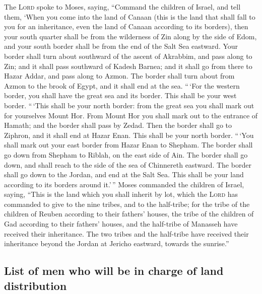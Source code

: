  The \textsc{Lord} spoke to Moses, saying, 
``Command the children of Israel, and tell them, `When you come into the
land of Canaan (this is the land that shall fall to you for an
inheritance, even the land of Canaan according to its borders),
 then your south quarter shall be from the wilderness of
Zin along by the side of Edom, and your south border shall be from the
end of the Salt Sea eastward.  Your border shall turn
about southward of the ascent of Akrabbim, and pass along to Zin; and it
shall pass southward of Kadesh Barnea; and it shall go from there to
Hazar Addar, and pass along to Azmon.  The border shall
turn about from Azmon to the brook of Egypt, and it shall end at the
sea.  ``\,`For the western border, you shall have the
great sea and its border. This shall be your west border. 
``\,`This shall be your north border: from the great sea you shall mark
out for yourselves Mount Hor.  From Mount Hor you shall
mark out to the entrance of Hamath; and the border shall pass by Zedad.
 Then the border shall go to Ziphron, and it shall end at
Hazar Enan. This shall be your north border.  ``\,`You
shall mark out your east border from Hazar Enan to Shepham.
 The border shall go down from Shepham to Riblah, on the
east side of Ain. The border shall go down, and shall reach to the side
of the sea of Chinnereth eastward.  The border shall go
down to the Jordan, and end at the Salt Sea. This shall be your land
according to its borders around it.'\,''  Moses commanded
the children of Israel, saying, ``This is the land which you shall
inherit by lot, which the \textsc{Lord} has commanded to give to the
nine tribes, and to the half-tribe;  for the tribe of the
children of Reuben according to their fathers' houses, the tribe of the
children of Gad according to their fathers' houses, and the half-tribe
of Manasseh have received their inheritance.  The two
tribes and the half-tribe have received their inheritance beyond the
Jordan at Jericho eastward, towards the sunrise.''

\hypertarget{list-of-men-who-will-be-in-charge-of-land-distribution}{%
\subsection{List of men who will be in charge of land
distribution}\label{list-of-men-who-will-be-in-charge-of-land-distribution}}

